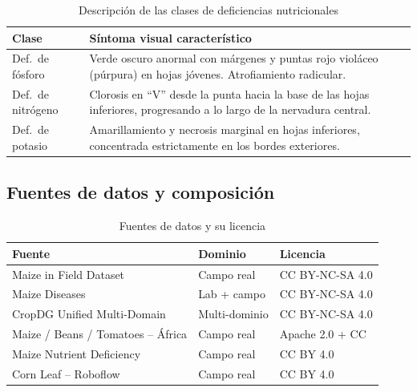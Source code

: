 \documentclass[12pt,letterpaper]{article}
\begin{document}
\begin{table}[H]
\caption{Descripci\'on de las clases de deficiencias nutricionales}
\label{tab:cls_def}
\centering
\small
\begin{singlespace}
\begin{tabular}{p{2.8cm}p{9.0cm}}
\toprule
\textbf{Clase} & \textbf{S\'intoma visual caracter\'istico} \\
\midrule
Def.\ de f\'osforo & Verde oscuro anormal con m\'argenes y puntas rojo viol\'aceo (p\'urpura) en hojas j\'ovenes. Atrofiamiento radicular. \\
Def.\ de nitr\'ogeno & Clorosis en ``V'' desde la punta hacia la base de las hojas inferiores, progresando a lo largo de la nervadura central. \\
Def.\ de potasio & Amarillamiento y necrosis marginal en hojas inferiores, concentrada estrictamente en los bordes exteriores. \\
\bottomrule
\end{tabular}
\end{singlespace}
\end{table}

\subsection{Fuentes de datos y composici\'on}

\begin{table}[H]
\caption{Fuentes de datos y su licencia}
\label{tab:sources}
\centering
\small
\begin{singlespace}
\begin{tabular}{p{2.3cm}p{1.6cm}p{2.6cm}}
\toprule
\textbf{Fuente} & \textbf{Dominio} & \textbf{Licencia} \\
\midrule
Maize in Field Dataset & Campo real & CC BY-NC-SA 4.0 \\
Maize Diseases & Lab + campo & CC BY-NC-SA 4.0 \\
CropDG Unified Multi-Domain & Multi-dominio & CC BY-NC-SA 4.0 \\
Maize / Beans / Tomatoes -- \'Africa & Campo real & Apache 2.0 + CC \\
Maize Nutrient Deficiency & Campo real & CC BY 4.0 \\
Corn Leaf -- Roboflow & Campo real & CC BY 4.0 \\
\bottomrule
\end{tabular}
\end{singlespace}
\end{table}
\end{document}
